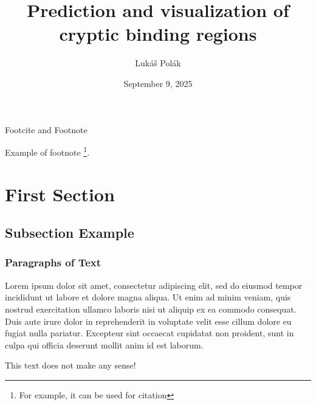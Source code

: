 \documentclass[aspectratio=169]{beamer}
\title[PredictionAndVisualization]{Prediction and visualization of cryptic binding regions}
\author[Polak L.]{Lukáš Polák}
\institute[CUNI]{Faculty of Mathematics and Physics, Charles University}
\date{September 9, 2025}
\begin{document}


\begin{frame}[plain]
    \titlepage
\end{frame}






\begin{frame}{Footcite and Footnote}

Example of footnote \footnote{For example, it can be used for citation}.

\end{frame}


\section{First Section}

\subsection{Subsection Example} 

\begin{frame}
\frametitle{Paragraphs of Text}
Lorem ipsum dolor sit amet, consectetur adipiscing elit, sed do eiusmod tempor incididunt ut labore et dolore magna aliqua. Ut enim ad minim veniam, quis nostrud exercitation ullamco laboris nisi ut aliquip ex ea commodo consequat. Duis aute irure dolor in reprehenderit in voluptate velit esse cillum dolore eu fugiat nulla pariatur. Excepteur sint occaecat cupidatat non proident, sunt in culpa qui officia deserunt mollit anim id est laborum.

\alert{This text does not make any sense!}

\end{frame}
\end{document}
